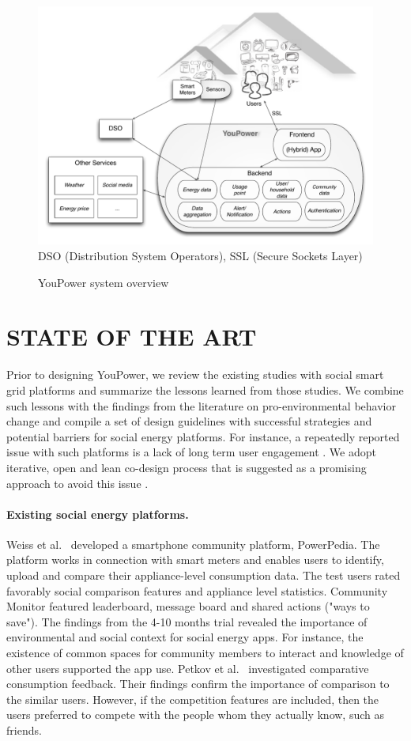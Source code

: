 \begin{figure}[t!]
\begin{center}\footnotesize
	\includegraphics[width=.7\textwidth]{img/civis_platform_overview.pdf}\\
	DSO (Distribution System Operators),  SSL (Secure Sockets Layer)
	\caption{YouPower system overview}\label{fig:platform}
\end{center}
\end{figure}

\section{\uppercase{State of the Art}}

\noindent Prior to designing YouPower, we review the existing studies with social smart grid platforms and summarize the lessons learned from those studies. We combine such lessons with the findings from the literature on pro-environmental behavior change and compile a set of design guidelines with successful strategies and potential barriers for social energy platforms. For instance, a repeatedly reported issue with such platforms is a lack of long term user engagement \cite{edward2015review}. We adopt iterative, open and lean co-design process \cite{folstad2008living,klein2013ux,leffingwell2010agile} that is suggested as a promising approach to avoid this issue \cite{schwartz2014people}.

\paragraph{Existing social energy platforms.} Weiss et al.~\cite{weiss2012powerpedia} developed a smartphone community platform, PowerPedia. The platform works in connection with smart meters and enables users to identify, upload and compare their appliance-level consumption data. The test users rated favorably social comparison features and appliance level statistics. Community Monitor \cite{dillahunt2014understanding} featured leaderboard, message board and shared actions ("ways to save"). The findings from the 4-10 months trial revealed the importance of environmental and social context for social energy apps. For instance, the existence of common spaces for community members to interact and knowledge of other users supported the app use. Petkov et al.~\cite{petkov2011motivating} investigated comparative consumption feedback. Their findings confirm the importance of comparison to the similar users. However, if the competition features are included, then the users preferred to compete with the people whom they actually know, such as friends.

